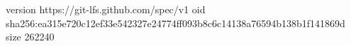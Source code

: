 version https://git-lfs.github.com/spec/v1
oid sha256:ea315e720c12ef33e542327e24774ff093b8c6c14138a76594b138b1f141869d
size 262240
